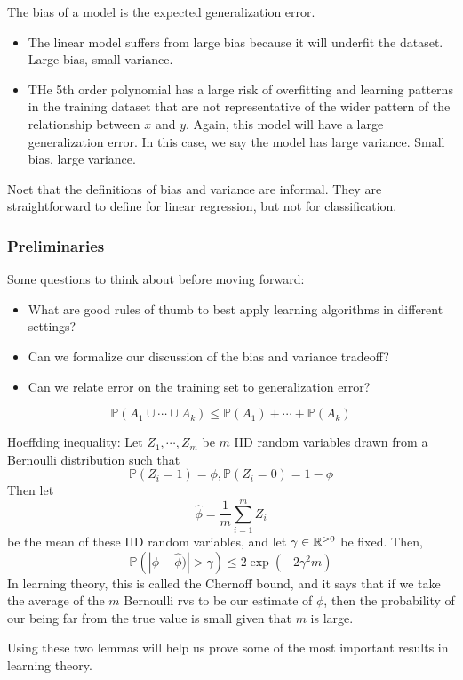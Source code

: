 \documentclass[12pt]{scrartcl}
\begin{document}
\begin{definition}
    The bias of a model is the expected generalization error.
\end{definition}
\begin{itemize}
    \item The linear model suffers from large bias because it will underfit the dataset. Large bias, small variance.
    \item THe 5th order polynomial has a large risk of overfitting and learning patterns in the training dataset that are not representative of the wider pattern of the relationship between $x$ and $y$. Again, this model will have a large generalization error. In this case, we say the model has large variance. Small bias, large variance.
\end{itemize}

\begin{note}
    Noet that the definitions of bias and variance are informal. They are straightforward to define for linear regression, but not for classification.
\end{note}

\subsubsection{Preliminaries}

Some questions to think about before moving forward:
\begin{itemize}
    \item What are good rules of thumb to best apply learning algorithms in different settings?
    \item Can we formalize our discussion of the bias and variance tradeoff?
    \item Can we relate error on the training set to generalization error?
\end{itemize}

\begin{lemma}
    \[\mathbb{P}(A_1 \cup \cdots \cup A_k) \leq \mathbb{P}(A_1) + \cdots + \mathbb{P}(A_k)\]
\end{lemma}
\begin{lemma}
    Hoeffding inequality: Let $Z_1, \cdots, Z_m$ be $m$ IID random variables drawn from a Bernoulli distribution such that 
    \[\mathbb{P}(Z_i = 1) = \phi, \mathbb{P}(Z_i = 0) = 1 - \phi\]
    Then let \[\hat{\phi} = \frac{1}{m}\sum_{i=1}^m Z_i\] be the mean of these IID random variables, and let $\gamma \in \mathbb R^{>0}$ be fixed. Then, 
    \[\mathbb{P}(|\phi-\hat \phi)| > \gamma) \leq 2 \exp(-2\gamma^2m)\]
    In learning theory, this is called the Chernoff bound, and it says that if we take the average of the $m$ Bernoulli rvs to be our estimate of $\phi$, then the probability of our being far from the true value is small given that $m$ is large. 
\end{lemma}

Using these two lemmas will help us prove some of the most important results in learning theory.
\end{document}
